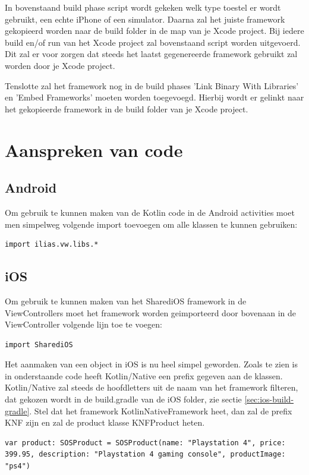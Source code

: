 In bovenstaand build phase script wordt gekeken welk type toestel er wordt gebruikt, een echte iPhone of een simulator. Daarna zal het juiste framework gekopieerd worden naar de build folder in de map van je Xcode project. Bij iedere build en/of run van het Xcode project zal bovenstaand script worden uitgevoerd. Dit zal er voor zorgen dat steeds het laatst gegenereerde framework gebruikt zal worden door je Xcode project.

Tenslotte zal het framework nog in de build phases 'Link Binary With Libraries' en 'Embed Frameworks' moeten worden toegevoegd. Hierbij wordt er gelinkt naar het gekopieerde framework in de build folder van je Xcode project.

\section{Aanspreken van code}
\subsection{Android}
Om gebruik te kunnen maken van de Kotlin code in de Android activities moet men simpelweg volgende import toevoegen om alle klassen te kunnen gebruiken: 

\begin{lstlisting}
import ilias.vw.libs.*
\end{lstlisting}

\subsection{iOS}
Om gebruik te kunnen maken van het SharediOS framework in de ViewControllers moet het framework worden geimporteerd door bovenaan in de ViewController volgende lijn toe te voegen:

\begin{lstlisting}
import SharediOS
\end{lstlisting}

Het aanmaken van een object in iOS is nu heel simpel geworden. Zoals te zien is in onderstaande code heeft Kotlin/Native een prefix gegeven aan de klassen. Kotlin/Native zal steeds de hoofdletters uit de naam van het framework filteren, dat gekozen wordt in de build.gradle van de iOS folder, zie sectie \ref{sec:ios-build-gradle}. Stel dat het framework KotlinNativeFramework heet, dan zal de prefix KNF zijn en zal de product klasse KNFProduct heten.

\begin{lstlisting}
var product: SOSProduct = SOSProduct(name: "Playstation 4", price: 399.95, description: "Playstation 4 gaming console", productImage: "ps4")
\end{lstlisting}

